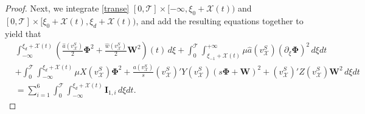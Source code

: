 \documentclass[12pt,reqno]{amsart}
\numberwithin{equation}{section}
\def\p{\partial}
\def\T{\mathcal{T}}
\def\ph{\mathbf{\Phi}}
\def\w{\mathbf{W}}
\def\vsx{v^S_{\mathcal{X}}}
\def\X{\mathcal{X}}
\begin{document}
\begin{proof}
	 Next, we integrate \eqref{transe} $[0,\T]\times[-\infty,\xi_0+\X(t))$ and $[0,\T]\times[\xi_0+\X(t),\xi_d+\X(t))$, and add the resulting equations together to yield that
	 \begin{equation}\label{neg-part}
	 	\begin{aligned}
	 		&\int_{-\infty}^{\xi_d+\X(t)}\left(\frac{\hat{a}(\vsx)}{2}\ph^2+\frac{\hat{w}(\vsx)}{2}\w^2\right)(t)\,d\xi+\int_{0}^{\T}\int_{\xi_{-1}+\X(t)}^{+\infty}\mu \hat{a}(\vsx)(\p_{\xi}\ph)^2\,d\xi dt\\
	 		&+\int_{0}^{\T}\int_{-\infty}^{\xi_d+\X(t)}\mu X(\vsx)\ph^2+\frac{a(\vsx)}{s}(\vsx)'Y(\vsx)(s\ph+\w)^2+(\vsx)'Z(\vsx)\w^2\,d\xi dt\\
	 		&=\sum_{i=1}^{6}\int_{0}^{\T}\int_{-\infty}^{\xi_d+\X(t)}\textbf{I}_{1,i}\,d\xi dt.
	 	\end{aligned}
	 \end{equation}
	

\end{proof}
\end{document}
